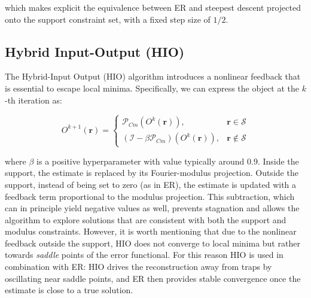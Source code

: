 which makes explicit the equivalence between ER and steepest descent projected onto the support constraint set, with 
a fixed step size of $1/2$.

\subsection{Hybrid Input-Output (HIO)}
The Hybrid-Input Output (HIO) algorithm introduces a nonlinear feedback that is essential to escape local minima. 
Specifically, we can express the object at the $k$-th iteration as: 

\begin{equation}
    O^{k+1}(\mathbf{r}) = 
    \begin{cases}
        \mathcal{P}_{Cm}(O^{k}(\mathbf{r})), &   \mathbf{r} \in \mathcal{S} \\
        (\mathcal{I} -\beta\mathcal{P}_{Cm})(O^{k}(\mathbf{r})),  & \mathbf{r} \notin \mathcal{S}
     \end{cases}
     \label{eq:HIO}
\end{equation}

where $\beta$ is a positive hyperparameter with value typically around $0.9$.
Inside the support, the estimate is replaced by its Fourier-modulus projection. Outside the support, instead of being 
set to zero (as in ER), the estimate is updated with a feedback term proportional to the modulus projection. 
This subtraction, which can in principle yield negative values as well, prevents stagnation and allows the algorithm 
to explore solutions that are consistent with both the support and modulus constraints.
However, it is worth mentioning that due to the nonlinear feedback outside the support, HIO does not converge to local 
minima but rather towards \textit{saddle} points of the error functional. For this reason HIO is used in
combination with ER: HIO drives the reconstruction away from traps by oscillating near saddle points, and ER then 
provides stable convergence once the estimate is close to a true solution. 


